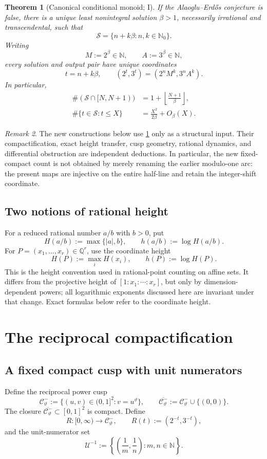 \documentclass[10pt,oneside]{article}
\newtheorem{theorem}{Theorem}[section]
\theoremstyle{definition}
\theoremstyle{remark}
\newtheorem{remark}[theorem]{Remark}
\newcommand{\N}{\mathbb N}
\newcommand{\Nzero}{\mathbb N_0}
\newcommand{\Q}{\mathbb Q}
\newcommand{\Sol}{\mathcal S}
\newcommand{\thetaq}{\vartheta}
\newcommand{\rec}{\mathcal C^-_{\thetaq}}
\newcommand{\unitrec}{\mathcal U^{-1}}
\newcommand{\statusI}{\textsc{I}}
\begin{document}
\begin{theorem}[Canonical conditional monoid; \statusI]
\label{thm:inherited-monoid}
If the Alaoglu--Erd\H{o}s conjecture is false, there is a unique least nonintegral solution \(\beta>1\), necessarily irrational and transcendental, such that
\[
 \Sol=\{n+k\beta:n,k\in\Nzero\}.
\]
Writing
\[
 M:=2^\beta\in\N,\qquad A:=3^\beta\in\N,
\]
every solution and output pair have unique coordinates
\[
 t=n+k\beta,
 \qquad
 (2^t,3^t)=(2^nM^k,3^nA^k).
\]
In particular,
\begin{align}
 \#(\Sol\cap[N,N+1))
   &=1+\left\lfloor\frac{N+1}{\beta}\right\rfloor,\label{eq:inherited-shell}\\
 \#\{t\in\Sol:t\le X\}
   &=\frac{X^2}{2\beta}+O_\beta(X).\label{eq:inherited-cumulative}
\end{align}
\end{theorem}

\begin{remark}
The new constructions below use \cref{thm:inherited-monoid} only as a structural input.  Their compactification, exact height transfer, cusp geometry, rational dynamics, and differential obstruction are independent deductions.  In particular, the new fixed-compact count is not obtained by merely renaming the earlier modulo-one arc: the present maps are injective on the entire half-line and retain the integer-shift coordinate.
\end{remark}

\subsection{Two notions of rational height}
For a reduced rational number \(a/b\) with \(b>0\), put
\[
 H(a/b):=\max\{|a|,b\},\qquad h(a/b):=\log H(a/b).
\]
For \(P=(x_1,\ldots,x_r)\in\Q^r\), use the coordinate height
\[
 H(P):=\max_i H(x_i),\qquad h(P):=\log H(P).
\]
This is the height convention used in rational-point counting on affine sets.  It differs from the projective height of \([1:x_1:\cdots:x_r]\), but only by dimension-dependent powers; all logarithmic exponents discussed here are invariant under that change.  Exact formulas below refer to the coordinate height.

\section{The reciprocal compactification}
\label{sec:reciprocal}

\subsection{A fixed compact cusp with unit numerators}
Define the reciprocal power cusp
\[
 \rec:=\{(u,v)\in(0,1]^2:v=u^{\thetaq}\},
 \qquad
 \overline{\rec}:=\rec\cup\{(0,0)\}.
\]
The closure \(\overline{\rec}\subset[0,1]^2\) is compact.  Define
\[
 R:[0,\infty)\longrightarrow\rec,
 \qquad
 R(t):=(2^{-t},3^{-t}),
\]
and the unit-numerator set
\[
 \unitrec:=\left\{\left(\frac1m,\frac1n\right):m,n\in\N\right\}.
\]
\end{document}
